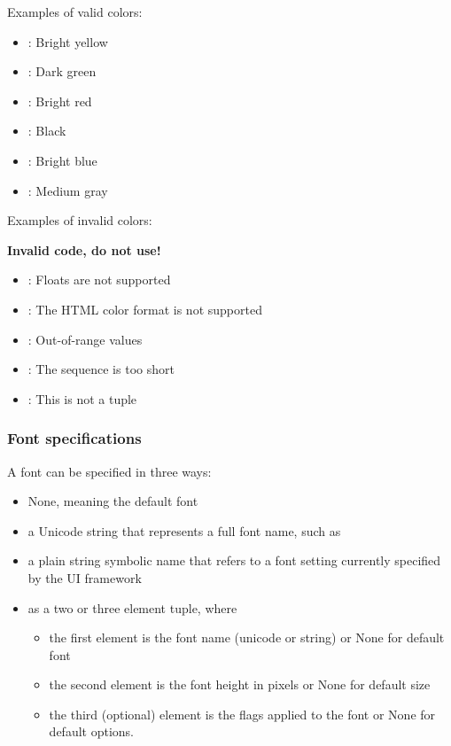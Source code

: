 Examples of valid colors:

\begin{itemize}
\item {}: Bright yellow
\item {}: Dark green
\item {}: Bright red
\item {}: Black
\item {}: Bright blue
\item {}: Medium gray
\end{itemize}

Examples of invalid colors:

\textbf{Invalid code, do not use!}
\begin{itemize}
\item {}: Floats are not supported
\item {}: The HTML color format is not supported
\item {}: Out-of-range values
\item {}: The sequence is too short
\item \code{[128,128,192]}: This is not a tuple
\end{itemize}

\subsubsection{Font specifications}
\label{subsubsec:font-specs}
A font can be specified in three ways: 
\begin{itemize}
\item None, meaning the default font
\item a Unicode string that represents a full font name, such as 
\item a plain string symbolic name that refers to a font setting currently specified by 
the UI framework
\item as a two or three element tuple, where 
\begin{itemize}
\item the first element is the font name (unicode or string) or None for default font
\item the second element is the font height in pixels or None for default size
\item the third (optional) element is the flags applied to the font or None for default options.
\end{itemize}
\end{itemize}

